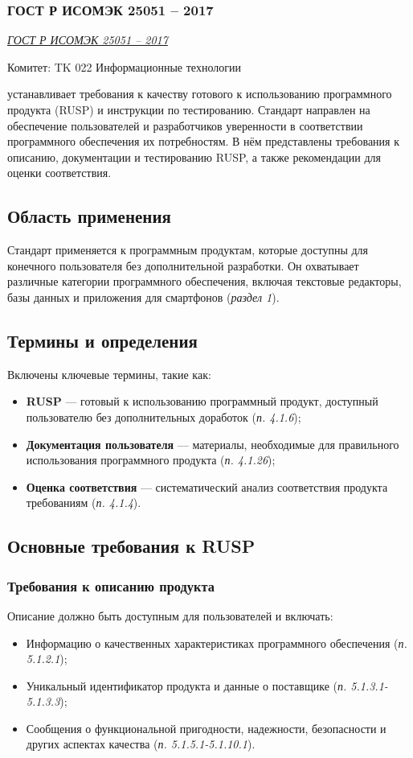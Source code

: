 \subsubsection{ГОСТ Р ИСОМЭК 25051 -- 2017}

\emph{\href{https://meganorm.ru/Data/645/64532.pdf}{ГОСТ Р ИСОМЭК 25051 -- 2017}}
\par
Комитет: TK 022 Информационные технологии

устанавливает требования к качеству готового к использованию программного продукта (RUSP) и
инструкции по тестированию.
Стандарт направлен на обеспечение пользователей и разработчиков уверенности в соответствии программного обеспечения их
потребностям.
В нём представлены требования к описанию, документации и тестированию RUSP, а также рекомендации для оценки соответствия.

\subsection*{Область применения}
Стандарт применяется к программным продуктам, которые доступны для конечного пользователя без дополнительной разработки.
Он охватывает различные категории программного обеспечения, включая текстовые редакторы,
базы данных и приложения для смартфонов (\textit{раздел 1}).

\subsection*{Термины и определения}
Включены ключевые термины, такие как:
\begin{itemize}
    \item \textbf{RUSP} — готовый к использованию программный продукт, доступный пользователю без дополнительных доработок (\textit{п. 4.1.6});
    \item \textbf{Документация пользователя} — материалы, необходимые для правильного использования программного продукта (\textit{п. 4.1.26});
    \item \textbf{Оценка соответствия} — систематический анализ соответствия продукта требованиям (\textit{п. 4.1.4}).
\end{itemize}

\subsection*{Основные требования к RUSP}
\subsubsection*{Требования к описанию продукта}
Описание должно быть доступным для пользователей и включать:
\begin{itemize}
    \item Информацию о качественных характеристиках программного обеспечения (\textit{п. 5.1.2.1});
    \item Уникальный идентификатор продукта и данные о поставщике (\textit{п. 5.1.3.1-5.1.3.3});
    \item Сообщения о функциональной пригодности, надежности, безопасности и других аспектах качества (\textit{п. 5.1.5.1-5.1.10.1}).
\end{itemize}

